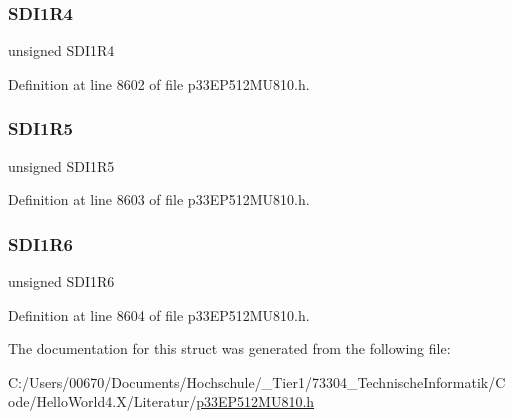 \subsubsection{\texorpdfstring{S\+D\+I1\+R4}{SDI1R4}}
{\footnotesize\ttfamily unsigned S\+D\+I1\+R4}



Definition at line 8602 of file p33\+E\+P512\+M\+U810.\+h.

\mbox{\label{structtag_r_p_i_n_r20_b_i_t_s_af67a18074110405c8f39195b156516fd}} 
\subsubsection{\texorpdfstring{S\+D\+I1\+R5}{SDI1R5}}
{\footnotesize\ttfamily unsigned S\+D\+I1\+R5}



Definition at line 8603 of file p33\+E\+P512\+M\+U810.\+h.

\mbox{\label{structtag_r_p_i_n_r20_b_i_t_s_afcd5c378977ecc407aee4d4d121dc8ce}} 
\subsubsection{\texorpdfstring{S\+D\+I1\+R6}{SDI1R6}}
{\footnotesize\ttfamily unsigned S\+D\+I1\+R6}



Definition at line 8604 of file p33\+E\+P512\+M\+U810.\+h.



The documentation for this struct was generated from the following file\+:\begin{DoxyCompactItemize}
\item 
C\+:/\+Users/00670/\+Documents/\+Hochschule/\+\_\+\+Tier1/73304\+\_\+\+Technische\+Informatik/\+Code/\+Hello\+World4.\+X/\+Literatur/\hyperlink{p33_e_p512_m_u810_8h}{p33\+E\+P512\+M\+U810.\+h}\end{DoxyCompactItemize}

